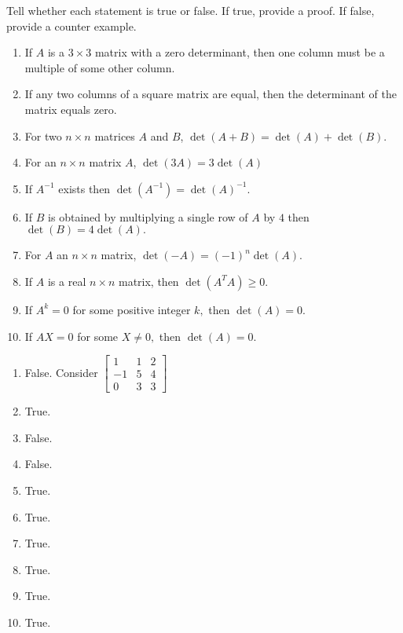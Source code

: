 \documentclass{ximera}
\begin{document}
\begin{problem}\label{prb:7.21} Tell whether each statement is true or false. If true, provide a proof. If false, provide a counter example.
\begin{enumerate}
\item If $A$ is a $3\times 3$ matrix with a zero determinant, then one
column must be a multiple of some other column.

\item If any two columns of a square matrix are equal, then the determinant
of the matrix equals zero.

\item For two $n\times n$ matrices $A$ and $B$, $\det \left( A+B\right)
=\det \left( A\right) +\det \left( B\right) .$

\item For an $n\times n$ matrix $A$, $\det \left( 3A\right) =3\det \left(
A\right) $

\item If $A^{-1}$ exists then $\det \left( A^{-1}\right) =\det \left(
A\right) ^{-1}.$

\item If $B$ is obtained by multiplying a single row of $A$ by $4$ then $%
\det \left( B\right) =4\det \left( A\right) .$

\item For $A$ an $n\times n$ matrix, $\det \left( -A\right) =\left(
-1\right) ^{n}\det \left( A\right) .$

\item If $A$ is a real $n\times n$ matrix, then $\det \left( A^{T}A\right)
\geq 0.$

\item If $A^{k}=0$ for some positive integer $k,$ then $\det \left(
A\right) =0.$

\item If $AX=0$ for some $X \neq 0,$ then $\det \left(
A\right) =0.$
\end{enumerate}
\begin{hint}
\begin{enumerate}
\item False. Consider $\left[
\begin{array}{rrr}
1 & 1 & 2 \\
-1 & 5 & 4 \\
0 & 3 & 3
\end{array}
\right] $
\item True.
\item False.
\item False.
\item True.
\item True.
\item True.
\item True.
\item True.
\item True.
\end{enumerate}
\end{hint}
\end{problem}
\end{document}
